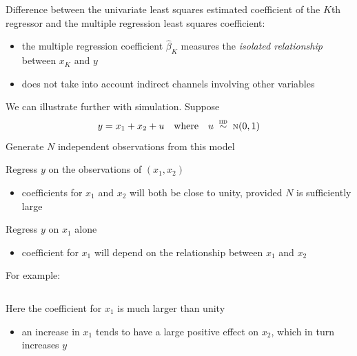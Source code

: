 \begin{frame}

    \vspace{2em}
    Difference between the univariate least squares estimated coefficient of 
    the $K$th regressor and the multiple regression least squares coefficient:
    \begin{itemize}
        \item the
    multiple regression coefficient $\hat \beta_K$ measures the \emph{isolated
    relationship} between $x_K$ and $y$
        \item does not take into account indirect
    channels involving other variables
    \end{itemize}
\end{frame}

\begin{frame}

    \vspace{2em}
    We can illustrate further with simulation.  Suppose
    \begin{equation*}
        y = x_1 + x_2 + u  
        \quad \text{where} \quad
        u \stackrel {\textrm{ {\sc iid }}} {\sim} \textrm{\sc n}(0,1)
    \end{equation*}
    Generate $N$ independent observations from this model 
    
    \vspace{.7em}
    Regress $y$
    on the observations of $(x_1, x_2)$
    \begin{itemize}
        \item coefficients for $x_1$ and $x_2$ will both be close to
    unity, provided $N$ is sufficiently large
    \end{itemize}
    
    Regress $y$ on $x_1$ alone
    \begin{itemize}
        \item coefficient for $x_1$ will depend on the relationship between $x_1$ and $x_2$
    \end{itemize}
 
\end{frame}

\begin{frame}
    \vspace{2em}
     For example:
        \inputminted{r}{small_sim.R}
        
        Here the coefficient for $x_1$ is much larger than unity
        \begin{itemize}
            \item an increase in $x_1$ tends to have a large positive effect on $x_2$,
        which in turn increases $y$
        \end{itemize}
        
\end{frame}

